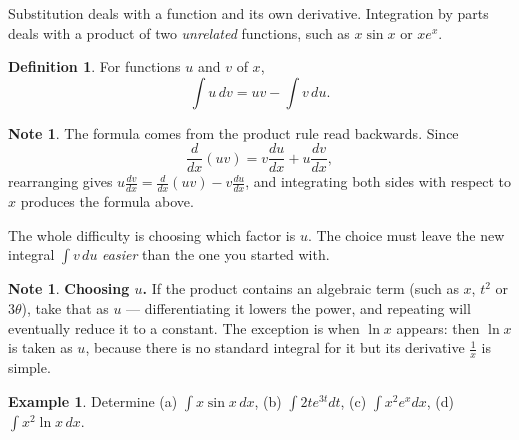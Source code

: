 \documentclass[11pt,a4paper]{article}
\theoremstyle{definition}
\newtheorem{definition}[thm]{Definition}
\newtheorem{example}[thm]{Example}
\newtheorem{note}[thm]{Note}
\begin{document}
Substitution deals with a function and its own derivative. Integration by parts deals
with a product of two \emph{unrelated} functions, such as $x\sin x$ or $xe^x$.

\begin{definition}
For functions $u$ and $v$ of $x$,
$$\int u\,dv=uv-\int v\,du.$$
\end{definition}

\begin{note}
The formula comes from the product rule read backwards. Since
$$\frac{d}{dx}(uv)=v\frac{du}{dx}+u\frac{dv}{dx},$$
rearranging gives $u\frac{dv}{dx}=\frac{d}{dx}(uv)-v\frac{du}{dx}$, and integrating
both sides with respect to $x$ produces the formula above.
\end{note}

The whole difficulty is choosing which factor is $u$. The choice must leave the new
integral $\int v\,du$ \emph{easier} than the one you started with.

\begin{note}
\textbf{Choosing $u$.} If the product contains an algebraic term (such as $x$, $t^2$ or
$3\theta$), take that as $u$ --- differentiating it lowers the power, and repeating will
eventually reduce it to a constant. The exception is when $\ln x$ appears: then $\ln x$
is taken as $u$, because there is no standard integral for it but its derivative
$\frac{1}{x}$ is simple.
\end{note}

\begin{example}
Determine \quad (a) $\displaystyle\int x\sin x\,dx$, \quad
(b) $\displaystyle\int 2te^{3t}dt$, \quad
(c) $\displaystyle\int x^2e^{x}dx$, \quad
(d) $\displaystyle\int x^2\ln x\,dx$.
\end{example}
\end{document}
